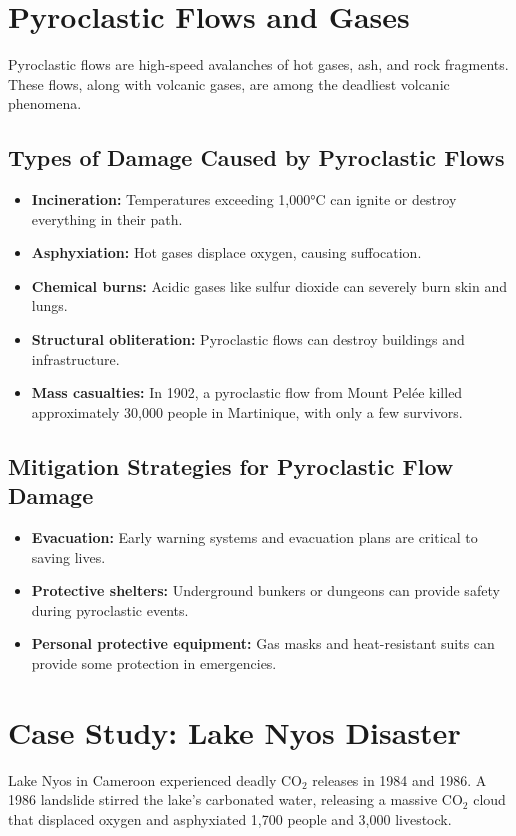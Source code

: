 \documentclass{article}
\begin{document}
\section{Pyroclastic Flows and Gases}
Pyroclastic flows are high-speed avalanches of hot gases, ash, and rock fragments. These flows, along with volcanic gases, are among the deadliest volcanic phenomena.

\subsection{Types of Damage Caused by Pyroclastic Flows}
\begin{itemize}
    \item \textbf{Incineration:} Temperatures exceeding 1,000°C can ignite or destroy everything in their path.
    \item \textbf{Asphyxiation:} Hot gases displace oxygen, causing suffocation.
    \item \textbf{Chemical burns:} Acidic gases like sulfur dioxide can severely burn skin and lungs.
    \item \textbf{Structural obliteration:} Pyroclastic flows can destroy buildings and infrastructure.
    \item \textbf{Mass casualties:} In 1902, a pyroclastic flow from Mount Pelée killed approximately 30,000 people in Martinique, with only a few survivors.
\end{itemize}

\subsection{Mitigation Strategies for Pyroclastic Flow Damage}
\begin{itemize}
    \item \textbf{Evacuation:} Early warning systems and evacuation plans are critical to saving lives.
    \item \textbf{Protective shelters:} Underground bunkers or dungeons can provide safety during pyroclastic events.
    \item \textbf{Personal protective equipment:} Gas masks and heat-resistant suits can provide some protection in emergencies.
\end{itemize}

\section{Case Study: Lake Nyos Disaster}
Lake Nyos in Cameroon experienced deadly CO$_2$ releases in 1984 and 1986. A 1986 landslide stirred the lake's carbonated water, releasing a massive CO$_2$ cloud that displaced oxygen and asphyxiated 1,700 people and 3,000 livestock.
\end{document}
